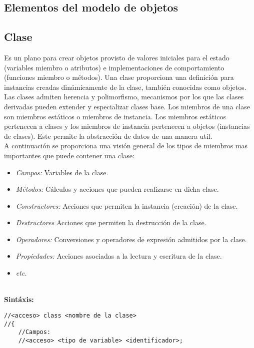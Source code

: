 \documentclass[letterpaper, 12pt]{article}
\begin{document}
    \newpage
        \begin{justify}
            \section{Elementos del modelo de objetos}
            \subsection{Clase}
            Es un plano para crear objetos provisto de valores iniciales para el estado (variables miembro o atributos) e 
            implementaciones de comportamiento (funciones miembro o métodos).
            Una clase proporciona una definición para instancias creadas dinámicamente de la clase, también conocidas como objetos. 
            Las clases admiten herencia y polimorfismo, mecanismos por los que las clases derivadas pueden extender y especializar clases base. 
            Los miembros de una clase son miembros estáticos o miembros de instancia. Los miembros estáticos pertenecen a clases y los miembros de instancia 
            pertenecen a objetos (instancias de clases).
            Este permite la abstracción de datos de una manera util.
            \\
            \newline
            A continuación se proporciona una visión general de los tipos de miembros mas importantes que puede contener una clase:
            \begin{itemize}
                \item \emph{Campos:} Variables de la clase. 
                \item \emph{Métodos:} Cálculos y acciones que pueden realizarse en dicha clase.
                \item \emph{Constructores:} Acciones que permiten la instancia (creación) de la clase.
                \item \emph{Destructores} Acciones que permiten la destrucción de la clase.
                \item \emph{Operadores:} Conversiones y operadores de expresión admitidos por la clase.
                \item \emph{Propiedades:} Acciones asociadas a la lectura y escritura de la clase.
                \item \emph{etc.}
            \end{itemize}
            \textbf{\\Sintáxis:}
            \begin{verbatim}
//<acceso> class <nombre de la clase>
//{
    //Campos:
    //<acceso> <tipo de variable> <identificador>;


\end{verbatim}
\end{justify}
\end{document}
